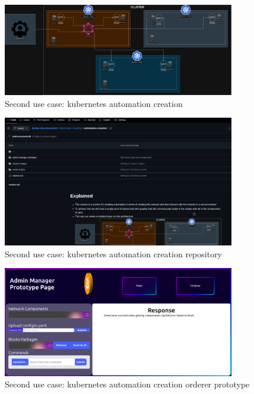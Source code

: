\begin{figure}[H]
    \centering
    \includegraphics[width=0.9\textwidth]{assets/use-case-2/automation-diagram.drawio.png} %
    \caption{Second use case: kubernetes automation creation}
    \label{fig:sample-image} 
\end{figure}

\begin{figure}[H]
    \centering
    \includegraphics[width=0.9\textwidth]{assets/use-case-2/automation-creation.png} %
    \caption{Second use case: kubernetes automation creation repository}
    \label{fig:sample-image} 
\end{figure}

\begin{figure}[H]
    \centering
    \includegraphics[width=0.9\textwidth]{assets/use-case-2/orderer-admin-manager.png} %
    \caption{Second use case: kubernetes automation creation orderer prototype}
    \label{fig:sample-image} 
\end{figure}


